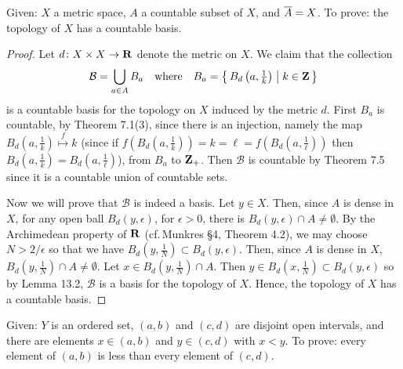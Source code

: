 \newpage
\begin{problem}[A]
Given: $X$ a metric space, $A$ a countable subset of $X$, and
$\overline{A}=X$. To prove: the topology of $X$ has a countable
basis.
\end{problem}
\begin{proof}
Let $d\colon X\times X\to\mathbf{R}$ denote the metric on $X$. We claim
that the collection
\[
\mathcal{B}=\bigcup_{a\in A} B_a
\quad
\text{where}
\quad
B_a=
\left\{\,B_d\left(a,\tfrac{1}{k}\right)\;\middle|\;k\in \mathbf{Z}\,\right\}
\]
is a countable basis for the topology on $X$ induced by the
metric $d$. First $B_a$ is countable, by Theorem 7.1(3), since
there is an injection,
namely the map
$B_d\left(a,\frac{1}{k}\right)\overset{f}{\longmapsto} k$ (since if
$f\left(B_d\left(a,\frac{1}{k}\right)\right)=k=\ell=f\left(B_d\left(a,\frac{1}{\ell}\right)\right)$
then $B_d\left(a,\frac{1}{k}\right)=B_d\left(a,\frac{1}{\ell}\right)$), from
$B_a$ to $\mathbf{Z}_+$. Then $\mathcal{B}$ is countable by Theorem 7.5
since it is a countable union of countable sets.

Now we will prove that $\mathcal{B}$ is indeed a basis. Let $y\in
X$. Then, since $A$ is dense in $X$, for any
open ball $B_d(y,\epsilon)$, for $\epsilon>0$, there is
$B_d(y,\epsilon)\cap A\neq\emptyset$. By the Archimedean
property of $\mathbf{R}$ (cf.\,Munkres \S4, Theorem 4.2), we may choose
$N>2/\epsilon$ so that we have
$B_d\left(y,\frac{1}{N}\right)\subset B_d(y,\epsilon)$. Then,
since $A$ is dense in $X$, $B_d\left(y,\frac{1}{N}\right)\cap
A\neq\emptyset$. Let $x\in B_d\left(y,\frac{1}{N}\right)\cap
A$. Then $y\in B_d\left(x,\frac{1}{N}\right)\subset
B_d(y,\epsilon)$ so by Lemma 13.2, $\mathcal{B}$ is a basis for
the topology of $X$. Hence, the topology of $X$ has a countable
basis.
\end{proof}
\newpage
\begin{problem}[B]
Given: $Y$ is an ordered set, $(a,b)$ and $(c,d)$ are disjoint
open intervals, and there are elements $x\in(a,b)$ and
$y\in(c,d)$ with $x<y$. To prove: every element of $(a,b)$ is less
than every element of $(c,d)$.
\end{problem}

